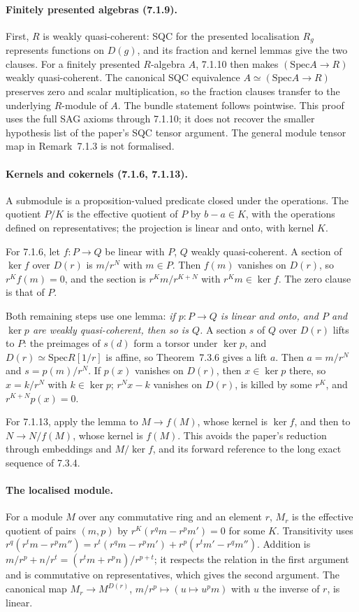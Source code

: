 \documentclass[11pt]{article}
\newcommand{\Spec}{\mathrm{Spec}}
\theoremstyle{remark}
\begin{document}
\paragraph{Finitely presented algebras (7.1.9).}
First, $R$ is weakly quasi-coherent: SQC for the presented localisation
$R_g$ represents functions on $D(g)$, and its fraction and kernel
lemmas give the two clauses. For a finitely presented $R$-algebra $A$,
7.1.10 then makes $(\Spec A\to R)$ weakly quasi-coherent. The canonical
SQC equivalence $A\simeq(\Spec A\to R)$ preserves zero and scalar
multiplication, so the fraction clauses transfer to the underlying
$R$-module of $A$. The bundle statement follows pointwise.
This proof uses the full SAG axioms through 7.1.10; it does not recover
the smaller hypothesis list of the paper's SQC tensor argument.
The general module tensor map in Remark~7.1.3 is not formalised.

\paragraph{Kernels and cokernels (7.1.6, 7.1.13).}
A submodule is a proposition-valued predicate closed under the
operations. The quotient $P/K$ is the effective quotient of $P$ by
$b-a\in K$, with the operations defined on representatives; the
projection is linear and onto, with kernel $K$.

For 7.1.6, let $f:P\to Q$ be linear with $P$, $Q$ weakly quasi-coherent.
A section of $\ker f$ over $D(r)$ is $m/r^N$ with $m\in P$. Then $f(m)$
vanishes on $D(r)$, so $r^Kf(m)=0$, and the section is
$r^Km/r^{K+N}$ with $r^Km\in\ker f$. The zero clause is that of $P$.

Both remaining steps use one lemma: \emph{if $p:P\to Q$ is linear and
onto, and $P$ and $\ker p$ are weakly quasi-coherent, then so is $Q$.}
A section $s$ of $Q$ over $D(r)$ lifts to $P$: the preimages of $s(d)$
form a torsor under $\ker p$, and $D(r)\simeq\Spec R[1/r]$ is affine, so
Theorem~7.3.6 gives a lift $a$. Then $a=m/r^N$ and $s=p(m)/r^N$. If
$p(x)$ vanishes on $D(r)$, then $x\in\ker p$ there, so $x=k/r^N$ with
$k\in\ker p$; $r^Nx-k$ vanishes on $D(r)$, is killed by some $r^K$, and
$r^{K+N}p(x)=0$.

For 7.1.13, apply the lemma to $M\to f(M)$, whose kernel is $\ker f$,
and then to $N\to N/f(M)$, whose kernel is $f(M)$. This avoids the
paper's reduction through embeddings and $M/\ker f$, and its forward
reference to the long exact sequence of 7.3.4.

\paragraph{The localised module.} For a module $M$ over any commutative
ring and an element $r$, $M_r$ is the effective quotient of pairs
$(m,p)$ by $r^K(r^qm-r^pm')=0$ for some $K$. Transitivity uses
$r^q(r^tm-r^pm'')=r^t(r^qm-r^pm')+r^p(r^tm'-r^qm'')$. Addition is
$m/r^p+n/r^t=(r^tm+r^pn)/r^{p+t}$; it respects the relation in the
first argument and is commutative on representatives, which gives the
second argument. The canonical map $M_r\to M^{D(r)}$,
$m/r^p\mapsto(u\mapsto u^pm)$ with $u$ the inverse of $r$, is linear.
\end{document}
